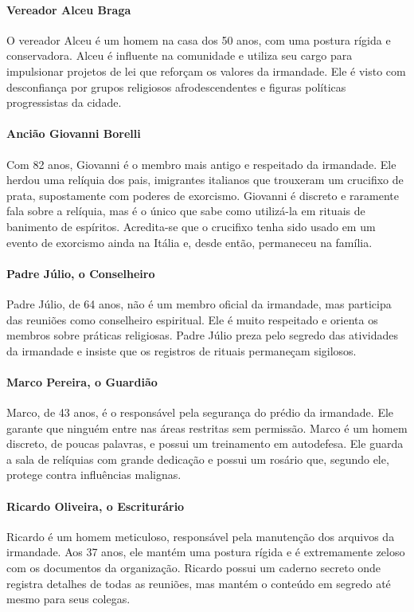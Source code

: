 \paragraph{Vereador Alceu Braga}  
O vereador Alceu é um homem na casa dos 50 anos, com uma postura rígida e conservadora. Alceu é influente na comunidade e utiliza seu cargo para impulsionar projetos de lei que reforçam os valores da irmandade. Ele é visto com desconfiança por grupos religiosos afrodescendentes e figuras políticas progressistas da cidade.

\paragraph{Ancião Giovanni Borelli}  
Com 82 anos, Giovanni é o membro mais antigo e respeitado da irmandade. Ele herdou uma relíquia dos pais, imigrantes italianos que trouxeram um crucifixo de prata, supostamente com poderes de exorcismo. Giovanni é discreto e raramente fala sobre a relíquia, mas é o único que sabe como utilizá-la em rituais de banimento de espíritos. Acredita-se que o crucifixo tenha sido usado em um evento de exorcismo ainda na Itália e, desde então, permaneceu na família.

\paragraph{Padre Júlio, o Conselheiro}  
Padre Júlio, de 64 anos, não é um membro oficial da irmandade, mas participa das reuniões como conselheiro espiritual. Ele é muito respeitado e orienta os membros sobre práticas religiosas. Padre Júlio preza pelo segredo das atividades da irmandade e insiste que os registros de rituais permaneçam sigilosos.

\paragraph{Marco Pereira, o Guardião}  
Marco, de 43 anos, é o responsável pela segurança do prédio da irmandade. Ele garante que ninguém entre nas áreas restritas sem permissão. Marco é um homem discreto, de poucas palavras, e possui um treinamento em autodefesa. Ele guarda a sala de relíquias com grande dedicação e possui um rosário que, segundo ele, protege contra influências malignas.

\paragraph{Ricardo Oliveira, o Escriturário}  
Ricardo é um homem meticuloso, responsável pela manutenção dos arquivos da irmandade. Aos 37 anos, ele mantém uma postura rígida e é extremamente zeloso com os documentos da organização. Ricardo possui um caderno secreto onde registra detalhes de todas as reuniões, mas mantém o conteúdo em segredo até mesmo para seus colegas.

